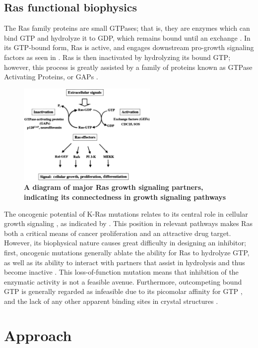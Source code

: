 \documentclass[12pt]{article}
\begin{document}
  \subsection*{Ras functional biophysics}
  The Ras family proteins are small GTPases; that is, they are enzymes which can bind GTP and hydrolyze it to GDP, which remains bound until an exchange \cite{pyla}. In its GTP-bound form, Ras is active, and engages downstream pro-growth signaling factors as seen in . Ras is then inactivated by hydrolyzing its bound GTP; however, this process is greatly assisted by a family of proteins known as GTPase Activating Proteins, or GAPs \cite{pyla}. 
    \begin{figure}[H]
  \centering
  \includegraphics[width=0.6\textwidth]{ras_blood.jpg}
  \caption{\textbf{A diagram of major Ras growth signaling partners, indicating its connectedness in growth signaling pathways} \cite{rasblood}}
  \label{growthfig}
  \end{figure}
  The oncogenic potential of K-Ras mutations relates to its central role in cellular growth signaling \cite{pyla}, as indicated by . This position in relevant pathways makes Ras both a critical means of cancer proliferation and an attractive drug target. However, its biophysical nature causes great difficulty in designing an inhibitor; first, oncogenic mutations generally ablate the ability for Ras to hydrolyze GTP, as well as its ability to interact with partners that assist in hydrolysis and thus become inactive \cite{pyla}. This loss-of-function mutation means that inhibition of the enzymatic activity is not a feasible avenue. Furthermore, outcompeting bound GTP is generally regarded as infeasible due to its picomolar affinity for GTP \cite{ostrem2013} , and the lack of any other apparent  binding sites in crystal structures \cite{ostrem2013}.
  
  \section*{Approach}
\end{document}
